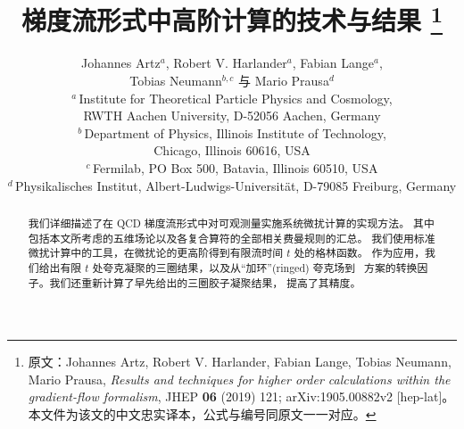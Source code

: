\documentclass[11pt]{ctexart}
\title{梯度流形式中高阶计算的技术与结果%
\thanks{原文：Johannes Artz, Robert V. Harlander, Fabian Lange, Tobias Neumann,
  Mario Prausa, \textit{Results and techniques for higher order calculations
  within the gradient-flow formalism}, JHEP \textbf{06} (2019) 121;
  arXiv:1905.00882v2 [hep-lat]。本文件为该文的中文忠实译本，公式与编号同原文一一对应。}}
\author{Johannes Artz$^a$, Robert V. Harlander$^a$, Fabian Lange$^a$,\\
  Tobias Neumann$^{b,c}$ 与 Mario Prausa$^d$\\[0.8em]
\normalsize
$^a$\,Institute for Theoretical Particle Physics and Cosmology,\\
\normalsize RWTH Aachen University, D-52056 Aachen, Germany\\[0.3em]
$^b$\,Department of Physics, Illinois Institute of Technology,\\
\normalsize Chicago, Illinois 60616, USA\\[0.3em]
$^c$\,Fermilab, PO Box 500, Batavia, Illinois 60510, USA\\[0.3em]
$^d$\,Physikalisches Institut, Albert-Ludwigs-Universit\"at,
D-79085 Freiburg, Germany}
\date{}
\begin{document}
\maketitle

\begin{abstract}
  我们详细描述了在 QCD 梯度流形式中对可观测量实施系统微扰计算的实现方法。
  其中包括本文所考虑的五维场论以及各复合算符的全部相关费曼规则的汇总。
  我们使用标准微扰计算中的工具，在微扰论的更高阶得到有限流时间 $t$ 处的格林函数。
  作为应用，我们给出有限 $t$ 处夸克凝聚的三圈结果，以及从``加环''(ringed)
  夸克场到 \msbar\ 方案的转换因子。我们还重新计算了早先给出的三圈胶子凝聚结果，
  提高了其精度。
\end{abstract}

\vspace{1em}
\tableofcontents

\clearpage









\end{document}
